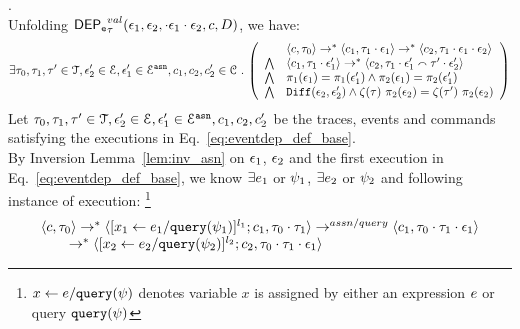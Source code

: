 \begin{subproof}.
\label{pf:alg_correct_base}
\\
Unfolding $\mathsf{DEP_{\mathtt{e}}}^{val}_{\mathtt{\tau}}(\mathtt{\epsilon}_1, \mathtt{\epsilon}_2, \cdot \mathtt{\epsilon}_1 \cdot \mathtt{\epsilon}_2, c, D)$, we have:
\begin{equation}
\label{eq:eventdep_def_base}
\exists \vtrace_0,
\vtrace_1, \vtrace' \in \mathcal{T}, \event_2' \in \eventset, \event_1' \in \eventset^{\asn}, {c}_1, {c}_2,  {c}_2' \in \cdom \st
  \left(
  \begin{array}{ll}   
 & \config{{c}, \vtrace_0} \rightarrow^{*} 
\config{{c}_1, \vtrace_1 \cdot \event_1}  \rightarrow^{*} 
  \config{{c}_2,  \vtrace_1 \cdot \event_1 \cdot \event_2 } 
 \\ 
 \bigwedge &
  \config{{c}_1, \vtrace_1 \cdot \event_1'}  \rightarrow^{*} 
  \config{{c}_2,  \vtrace_1 \cdot \event_1' \tracecat \vtrace' \cdot \event_2' } 
\\
\bigwedge &  \pi_1(\event_1) = \pi_1(\event_1') \land \pi_2(\event_1) = \pi_2(\event_1') 
\\
\bigwedge & 
\diff(\event_2,\event_2' ) \land 
\vcounter(\vtrace) ~ \pi_2(\event_2)
= 
\vcounter(\vtrace') ~ \pi_2(\event_2)\\
\end{array}
\right)
\end{equation}
%
Let $\mathtt{\tau}_0,
\mathtt{\tau}_1, \mathtt{\tau}' \in \mathcal{T}, \mathtt{\epsilon}_2' \in \mathcal{E}, \mathtt{\epsilon}_1' \in \mathcal{E}^{\mathtt{{asn}}}, {c}_1, {c}_2,  {c}_2'$ be the traces, events and commands satisfying the executions in Eq.~\ref{eq:eventdep_def_base}.
\\
By Inversion Lemma~\ref{lem:inv_asn} on 
 $\mathtt{\epsilon}_1$, $\mathtt{\epsilon}_2$ and the first execution in Eq.~\ref{eq:eventdep_def_base},
 we know $\exists e_1$ or $\psi_1$, $\exists e_2$ or $\psi_2$ and following instance of execution:
%
\footnote{
$\mathrel{ x \leftarrow e / {\tt query}(\psi) }$ denotes variable $x$ is assigned by either an expression $e$ or query ${\tt query}(\psi)$
}
\begin{equation}
\label{eq:valdep_inv1}
  \begin{array}{l}   
\langle {c}, \mathtt{\tau}_0 \rangle \rightarrow^{*} 
\langle [\mathrel{ {x}_1 \leftarrow e_1 / {\tt query}(\psi_1) }]^{l_1} ; {c}_1, \mathtt{\tau}_0 \cdot \mathtt{\tau}_1 \rangle  
\rightarrow^{assn/query}
 \langle c_1, \mathtt{\tau}_0 \cdot \mathtt{\tau}_1 \cdot \mathtt{\epsilon}_1 \rangle \\
  \qquad \rightarrow^{*} 
  \langle [\mathrel{ {x}_2 \leftarrow e_2 / {\tt query}(\psi_2) }]^{l_2};{c}_2, 
  \mathtt{\tau}_0 \cdot \mathtt{\tau}_1 \cdot \mathtt{\epsilon}_1 \rangle 

\end{array}
\end{equation}
\end{subproof}
